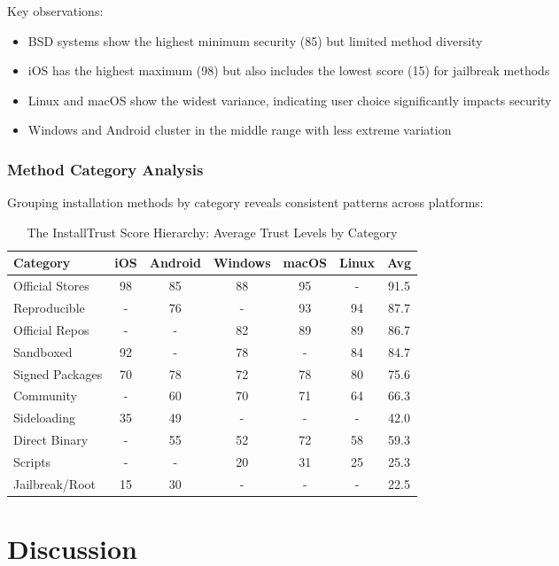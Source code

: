 \documentclass[11pt,a4paper]{article}
\begin{document}
Key observations:
\begin{itemize}
    \item BSD systems show the highest minimum security (85) but limited method diversity
    \item iOS has the highest maximum (98) but also includes the lowest score (15) for jailbreak methods
    \item Linux and macOS show the widest variance, indicating user choice significantly impacts security
    \item Windows and Android cluster in the middle range with less extreme variation
\end{itemize}

\subsubsection{Method Category Analysis}

Grouping installation methods by category reveals consistent patterns across platforms:

\begin{table}[h]
\centering
\caption{The InstallTrust Score Hierarchy: Average Trust Levels by Category}
\begin{tabular}{lcccccc}
\toprule
\textbf{Category} & \textbf{iOS} & \textbf{Android} & \textbf{Windows} & \textbf{macOS} & \textbf{Linux} & \textbf{Avg} \\
\midrule
Official Stores & 98 & 85 & 88 & 95 & - & 91.5 \\
Reproducible & - & 76 & - & 93 & 94 & 87.7 \\
Official Repos & - & - & 82 & 89 & 89 & 86.7 \\
Sandboxed & 92 & - & 78 & - & 84 & 84.7 \\
Signed Packages & 70 & 78 & 72 & 78 & 80 & 75.6 \\
Community & - & 60 & 70 & 71 & 64 & 66.3 \\
Sideloading & 35 & 49 & - & - & - & 42.0 \\
Direct Binary & - & 55 & 52 & 72 & 58 & 59.3 \\
Scripts & - & - & 20 & 31 & 25 & 25.3 \\
Jailbreak/Root & 15 & 30 & - & - & - & 22.5 \\
\bottomrule
\end{tabular}
\end{table}

\section{Discussion}
\end{document}
